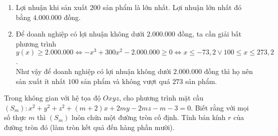 \begin{ex}
{\begin{enumerate}
			\item Lợi nhuận khi sản xuất $200$ sản phẩm là lớn nhất. Lợi nhuận lớn nhất đó bằng $4.000.000$ đồng.
			\item Để doanh nghiệp có lợi nhuận không dưới $2.000.000$ đồng, ta cần giải bất phương trình
			$y(x)\geq 2.000.000 \Leftrightarrow -x^3 + 300x^2 - 2.000.000 \geq 0 \Leftrightarrow x \leq -73{,}2 \vee 100\leq x \leq 273{,}2$.\\
			Như vậy để doanh nghiệp có lợi nhuận không dưới $2.000.000$ đồng thì họ nên sản xuất ít nhất $100$ sản phẩm và không vượt quá $273$ sản phẩm.
		\end{enumerate}
	}
\end{ex}

\begin{ex}
	Trong không gian với hệ tọa độ $Oxyz$, cho phương trình mặt cầu $(S_m)\colon x^2+y^2+z^2+(m+2) x+2m y-2m z-m-3=0$. Biết rằng với mọi số thực $m$ thì $(S_m)$ luôn chứa một đường tròn cố định. Tính bán kính $r$ của đường tròn đó (làm tròn kết quả đến hàng phần mười).
\end{ex}

